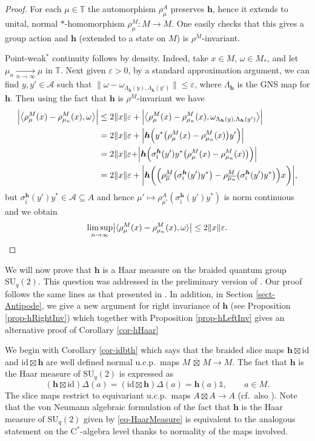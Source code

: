 \documentclass[12pt,reqno,a4paper]{amsart}
\theoremstyle{definition}
\newcommand{\cst}{\ensuremath{\mathrm{C}^*}}
\newcommand{\eps}{\varepsilon}
\newcommand{\I}{\mathds{1}}
\newcommand{\id}{\mathrm{id}}
\newcommand{\ii}{\mathrm{i}}
\newcommand{\TT}{\mathbb{T}}
\newcommand{\cA}{\mathscr{A}}
\newcommand{\bh}{{\boldsymbol{h}}}
\newcommand{\SU}{\mathrm{SU}}
\numberwithin{equation}{section}
\begin{document}
\begin{proof}
For each $\mu\in\TT$ the automorphism $\rho^A_\mu$ preserves $\bh$, hence it extends to unital, normal $*$-homomorphism $\rho^M_\mu\colon M\to M$. One easily checks that this gives a group action and $\bh$ (extended to a state on $M$) is $\rho^M$-invariant.

Point-weak${}^*$ continuity follows by density. Indeed, take $x\in M$, $\omega\in M_*$, and let $\mu_n\xrightarrow[n\to\infty]{}\mu$ in $\TT$. Next given $\eps>0$, by a standard approximation argument, we can find $y,y'\in\cA$ such that $\|\omega-\omega_{\Lambda_\bh(y),\Lambda_\bh(y')}\|\leq\eps$, where $\Lambda_\bh$ is the GNS map for $\bh$. Then using the fact that $\bh$ is $\rho^M$-invariant we have
\begin{align*}
\Bigl|\bigl\langle\rho^M_\mu(x)-\rho^M_{\mu_n}(x),\omega\bigr\rangle\Bigr|
&\leq 2\|x\|\eps+\Bigl|\bigl\langle\rho^M_\mu(x)-\rho^M_{\mu_n}(x),\omega_{\Lambda_\bh(y),\Lambda_\bh(y')}\bigr\rangle\Bigr|\\
&=2\|x\|\eps+\Bigl|\bh\Bigl(y^*\bigl(\rho^M_\mu(x)-\rho^M_{\mu_n}(x)\bigr)y'\Bigr)\Bigr|\\
&=2\|x\|\eps+\Bigr|\bh\Bigr(\sigma^\bh_\ii(y')y^*\bigl(\rho^M_\mu(x)-\rho^M_{\mu_n}(x)\bigr)\Bigr)\Bigr|\\
&=2\|x\|\eps+\biggl|\bh\biggl(\Bigl(
\rho^M_{\overline{\mu}}\bigl(\sigma^\bh_\ii(y')y^*\bigr)-
\rho^M_{\overline{\mu_n}}\bigl(\sigma^\bh_\ii(y')y^*\bigr)\Bigr)x\biggr)\biggr|,
\end{align*}
but $\sigma^\bh_\ii(y')y^*\in\cA\subseteq A$ and hence $\mu'\mapsto\rho^A_{\mu'}(\sigma^\bh_\ii(y')y^*)$ is norm continuous and we obtain
\[
\limsup_{n\to\infty}\bigl|\langle\rho^M_\mu(x)-\rho^M_{\mu_n}(x),\omega\rangle\bigr|\leq 2\|x\|\eps.\qedhere
\]
\end{proof}

We will now prove that $\bh$ is a Haar measure on the braided quantum group $\SU_q(2)$. This question was addressed in the preliminary version \cite{BraidedSU2-arXiv} of \cite{BraidedSU2}. Our proof follows the same lines as that presented in \cite{BraidedSU2-arXiv}. In addition, in Section \ref{sect-Antipode}, we give a new argument for right invariance of $\bh$ (see Proposition \ref{prop-hRightInv}) which together with Proposition \ref{prop-hLeftInv} gives an alternative proof of Corollary \ref{cor-hHaar}

We begin with Corollary \ref{cor-idbth} which says that the braided slice maps $\bh\boxtimes\id$ and $\id\boxtimes\bh$ are well defined normal u.c.p.~maps $M\,\overline{\boxtimes}\,M\to M$. The fact that $\bh$ is the Haar measure of $\SU_q(2)$ is expressed as
\begin{equation}\label{eq-HaarMeasure}
(\bh\boxtimes\id)\Delta(a)=(\id\boxtimes\bh)\Delta(a)=\bh(a)\I,\qquad a\in M.
\end{equation}
The slice maps restrict to equivariant u.c.p.~maps $A\boxtimes A\to A$ (cf.~also \cite[Section 5.2]{MeyerRoyWoronowiczI}). Note that the von Neumann algebraic formulation of the fact that $\bh$ is the Haar measure of $\SU_q(2)$ given by \eqref{eq-HaarMeasure} is equivalent to the analogous statement on the \cst-algebra level thanks to normality of the maps involved.
\end{document}
